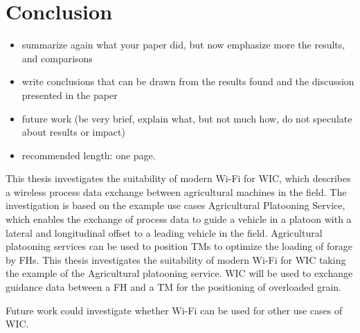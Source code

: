 \chapter{Conclusion}
\acresetall

\begin{itemize}
\item summarize again what your paper did, but now emphasize more the results, and comparisons
\item write conclusions that can be drawn from the results found and the discussion presented in the paper
\item future work (be very brief, explain what, but not much how, do not speculate about results or impact)
\item recommended length: one page.
\end{itemize}
This thesis investigates the suitability of modern Wi-Fi for \ac{WIC}, which describes a wireless process data exchange between agricultural machines in the field.
The investigation is based on the example use cases Agricultural Platooning Service,
which enables the exchange of process data to guide a vehicle in a platoon with a lateral and longitudinal
offset to a leading vehicle  in the field.
Agricultural platooning services can be used to position \ac{TM}s to optimize the loading of forage by \ac{FH}s.
This thesis investigates the suitability of modern Wi-Fi for \ac{WIC} taking the example of the Agricultural platooning service.
\ac{WIC} will be used to exchange guidance data between a \ac{FH} and a \ac{TM} for the positioning of overloaded grain.

\begin{comment}
    Untersuchen, welche Routing protocols
\end{comment}

Future work could investigate whether Wi-Fi can be used for other use cases of \ac{WIC}.
